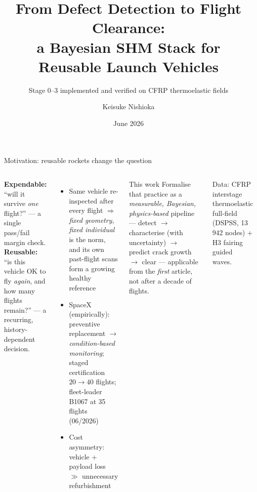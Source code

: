 \documentclass[aspectratio=169,10pt]{beamer}
\title{From Defect Detection to Flight Clearance:\\
a Bayesian SHM Stack for Reusable Launch Vehicles}
\subtitle{Stage 0--3 implemented and verified on CFRP thermoelastic fields}
\author{Keisuke Nishioka}
\institute{Leibniz Universit\"at Hannover \quad$\cdot$\quad Keio University}
\date{June 2026}
\begin{document}
\maketitle

\begin{frame}{Motivation: reusable rockets change the question}
\begin{columns}[T]
\textbf{Expendable:} ``will it survive \emph{one} flight?'' --- a single
pass/fail margin check.\\[1.5mm]
\textbf{Reusable:} \alert{``is this vehicle OK to fly \emph{again}, and how many
flights remain?''} --- a recurring, history-dependent decision.
\begin{itemize}
  \item Same vehicle re-inspected after every flight
        $\Rightarrow$ \emph{fixed geometry, fixed individual} is the norm,
        and its own past-flight scans form a growing healthy reference
  \item SpaceX (empirically): preventive replacement $\to$
        \emph{condition-based monitoring}; staged certification
        $20\to40$ flights; fleet-leader B1067 at 35 flights (06/2026)
  \item Cost asymmetry: vehicle + payload loss $\gg$ unnecessary refurbishment
\end{itemize}
\begin{block}{This work}
Formalise that practice as a \emph{measurable, Bayesian, physics-based}
pipeline --- detect $\to$ characterise (with uncertainty) $\to$ predict crack
growth $\to$ clear --- applicable from the \emph{first} article, not after a
decade of flights.
\end{block}
\footnotesize Data: CFRP interstage thermoelastic full-field (DSPSS, 13\,942
nodes) + H3 fairing guided waves.
\end{columns}
\end{frame}
\end{document}
